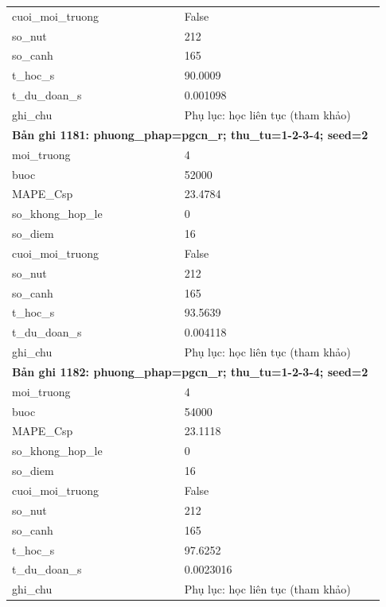 \begin{longtable}{p{0.43\linewidth}p{0.50\linewidth}}
cuoi\_\allowbreak moi\_\allowbreak truong & False \\
so\_\allowbreak nut & 212 \\
so\_\allowbreak canh & 165 \\
t\_\allowbreak hoc\_\allowbreak s & 90.0009 \\
t\_\allowbreak du\_\allowbreak doan\_\allowbreak s & 0.001098 \\
ghi\_\allowbreak chu & Phụ lục: học liên tục (tham khảo) \\
\midrule
\multicolumn{2}{p{0.95\linewidth}}{\textbf{Bản ghi 1181: phuong\_phap=pgcn\_r; thu\_tu=1-2-3-4; seed=2}} \\
moi\_\allowbreak truong & 4 \\
buoc & 52000 \\
MAPE\_\allowbreak Csp & 23.4784 \\
so\_\allowbreak khong\_\allowbreak hop\_\allowbreak le & 0 \\
so\_\allowbreak diem & 16 \\
cuoi\_\allowbreak moi\_\allowbreak truong & False \\
so\_\allowbreak nut & 212 \\
so\_\allowbreak canh & 165 \\
t\_\allowbreak hoc\_\allowbreak s & 93.5639 \\
t\_\allowbreak du\_\allowbreak doan\_\allowbreak s & 0.004118 \\
ghi\_\allowbreak chu & Phụ lục: học liên tục (tham khảo) \\
\midrule
\multicolumn{2}{p{0.95\linewidth}}{\textbf{Bản ghi 1182: phuong\_phap=pgcn\_r; thu\_tu=1-2-3-4; seed=2}} \\
moi\_\allowbreak truong & 4 \\
buoc & 54000 \\
MAPE\_\allowbreak Csp & 23.1118 \\
so\_\allowbreak khong\_\allowbreak hop\_\allowbreak le & 0 \\
so\_\allowbreak diem & 16 \\
cuoi\_\allowbreak moi\_\allowbreak truong & False \\
so\_\allowbreak nut & 212 \\
so\_\allowbreak canh & 165 \\
t\_\allowbreak hoc\_\allowbreak s & 97.6252 \\
t\_\allowbreak du\_\allowbreak doan\_\allowbreak s & 0.0023016 \\
ghi\_\allowbreak chu & Phụ lục: học liên tục (tham khảo) \\

\end{longtable}
